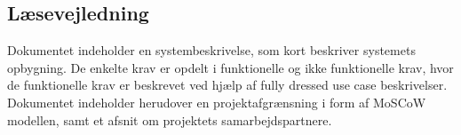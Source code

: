 \subsection{Læsevejledning}
Dokumentet indeholder en systembeskrivelse, som kort beskriver systemets opbygning. De enkelte krav er opdelt i funktionelle og ikke funktionelle krav, hvor de funktionelle krav er beskrevet ved hjælp af fully dressed use case beskrivelser. Dokumentet indeholder herudover en projektafgrænsning i form af MoSCoW modellen, samt et afsnit om projektets samarbejdspartnere. 